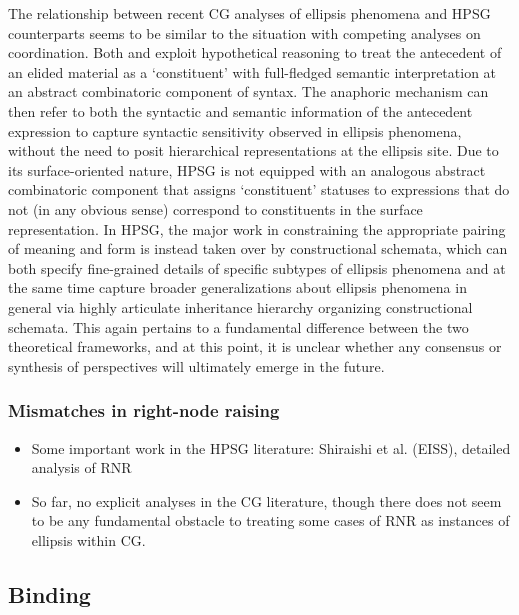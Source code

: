 \documentclass[output=paper]{langsci/langscibook}
\begin{document}
The relationship between recent CG analyses of ellipsis phenomena and
HPSG counterparts seems to be similar to the situation with competing
analyses on coordination. Both \citet{barker-sluicing} and
\citet{kubota-levine-pseudo} exploit hypothetical reasoning to treat the
antecedent of an elided material as a `constituent' with full-fledged
semantic interpretation at an abstract combinatoric component of
syntax. The anaphoric mechanism can then refer to both the syntactic
and semantic information of the antecedent expression to capture
syntactic sensitivity observed in ellipsis phenomena, without the need
to posit hierarchical representations at the ellipsis site. Due to its
surface-oriented nature, HPSG is not equipped with an analogous
abstract combinatoric component that assigns `constituent' statuses to
expressions that do not (in any obvious sense) correspond to
constituents in the surface representation. In HPSG, the major work in
constraining the appropriate pairing of meaning and form is instead
taken over by constructional schemata, which can both specify
fine-grained details of specific subtypes of ellipsis phenomena and at
the same time capture broader generalizations about ellipsis phenomena
in general via highly articulate inheritance hierarchy organizing
constructional schemata. This again pertains to a fundamental
difference between the two theoretical frameworks, and at this point,
it is unclear whether any consensus or synthesis of perspectives will
ultimately emerge in the future.




\subsubsection{Mismatches in right-node raising}

\begin{itemize}
 \item Some important work in the HPSG literature:
  Shiraishi et al. (EISS),  detailed  analysis of RNR
\end{itemize}
\begin{itemize}
 \item So far, no explicit analyses in the CG literature, though there does
  not seem to be any fundamental obstacle to treating some cases of RNR
  as instances of ellipsis within CG.
\end{itemize}

\subsection{Binding}
\end{document}
